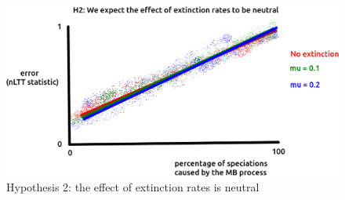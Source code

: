 \begin{figure}[!htbp]
  \includegraphics[width=\textwidth]{razzo-figures/fig_h_2.png}
  \caption{
    Hypothesis 2: the effect of extinction rates is neutral
  }
  \label{fig:h_2}
\end{figure}